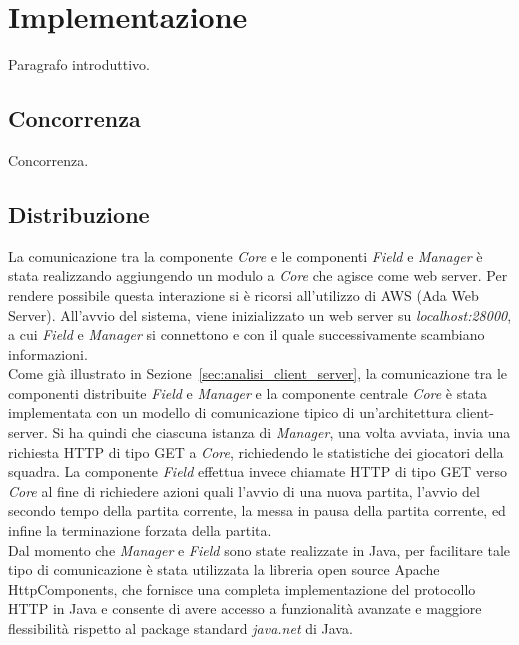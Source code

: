 
\section{Implementazione}
\label{sec:implementazione}

Paragrafo introduttivo.

\subsection{Concorrenza}
\label{sec:implemetazione_concorrenza}

Concorrenza.

\subsection{Distribuzione}
\label{sec:implementazione_distribuzione}

La comunicazione tra la componente \emph{Core} e le componenti \emph{Field} e \emph{Manager} è stata realizzando aggiungendo un modulo a \emph{Core} che agisce come web server. Per rendere possibile questa interazione si è ricorsi all'utilizzo di AWS (Ada Web Server). All'avvio del sistema, viene inizializzato un web server su \emph{localhost:28000}, a cui \emph{Field} e \emph{Manager} si connettono e con il quale successivamente scambiano informazioni.\\

Come già illustrato in Sezione~\ref{sec:analisi_client_server}, la comunicazione tra le componenti distribuite \emph{Field} e \emph{Manager} e la componente centrale \emph{Core} \`{e} stata implementata con un modello di comunicazione tipico di un’architettura client-server. Si ha quindi che ciascuna istanza di \emph{Manager}, una volta avviata, invia una richiesta HTTP di tipo GET a \emph{Core}, richiedendo le statistiche dei giocatori della squadra. La componente \emph{Field} effettua invece chiamate HTTP di tipo GET verso \emph{Core} al fine di richiedere azioni quali l'avvio di una nuova partita, l'avvio del secondo tempo della partita corrente, la messa in pausa della partita corrente, ed infine la terminazione forzata della partita.\\

Dal momento che \textit{Manager} e \textit{Field} sono state realizzate in Java, per facilitare tale tipo di comunicazione \`{e} stata utilizzata la libreria open source Apache HttpComponents, che fornisce una completa implementazione del protocollo HTTP in Java e consente di avere accesso a funzionalit\`{a} avanzate e maggiore flessibilit\`{a} rispetto al package standard \emph{java.net} di Java.\\

